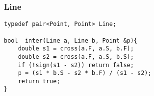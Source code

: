 \subsubsection{Line}
\begin{verbatim}
typedef pair<Point, Point> Line;

bool  inter(Line a, Line b, Point &p){
    double s1 = cross(a.F, a.S, b.F);
    double s2 = cross(a.F, a.S, b.S);
    if (!sign(s1 - s2)) return false;
    p = (s1 * b.S - s2 * b.F) / (s1 - s2);
    return true;
}
\end{verbatim}
